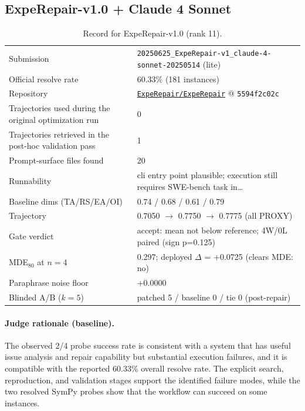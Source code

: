 \subsection{ExpeRepair-v1.0 + Claude 4 Sonnet}
\label{app:agent11}
\begin{table}[H]\centering\scriptsize
\caption{Record for ExpeRepair-v1.0 (rank 11).}
\begin{tabular}{lp{8.2cm}}\toprule
Submission & \texttt{20250625\_\allowbreak{}ExpeRepair-v1\_\allowbreak{}claude-4-sonnet-20250514} (lite) \\
Official resolve rate & 60.33\% (181 instances) \\
Repository & \href{https://github.com/ExpeRepair/ExpeRepair}{\texttt{ExpeRepair/ExpeRepair}} @ \texttt{5594f2c02c} \\
Trajectories used during the original optimization run & 0 \\
Trajectories retrieved in the post-hoc validation pass & 1 \\
Prompt-surface files found & 20 \\
Runnability & cli entry point plausible; execution still requires SWE-bench task in\ldots{} \\
Baseline dims (TA/RS/EA/OI) & 0.74 / 0.68 / 0.61 / 0.79 \\
Trajectory & 0.7050 $\to$ 0.7750 $\to$ 0.7775 (all PROXY) \\
Gate verdict & accept: mean not below reference; 4W/0L paired (sign p=0.125) \\
MDE$_{80}$ at $n{=}4$ & 0.297; deployed $\Delta$ = +0.0725 (clears MDE: no) \\
Paraphrase noise floor & +0.0000 \\
Blinded A/B ($k{=}5$) & patched 5 / baseline 0 / tie 0 (post-repair) \\
\bottomrule\end{tabular}\end{table}
\paragraph{Judge rationale (baseline).}
The observed 2/4 probe success rate is consistent with a system that has useful issue analysis and repair capability but substantial execution failures, and it is compatible with the reported 60.33\% overall resolve rate. The explicit search, reproduction, and validation stages support the identified failure modes, while the two resolved SymPy probes show that the workflow can succeed on some instances.
